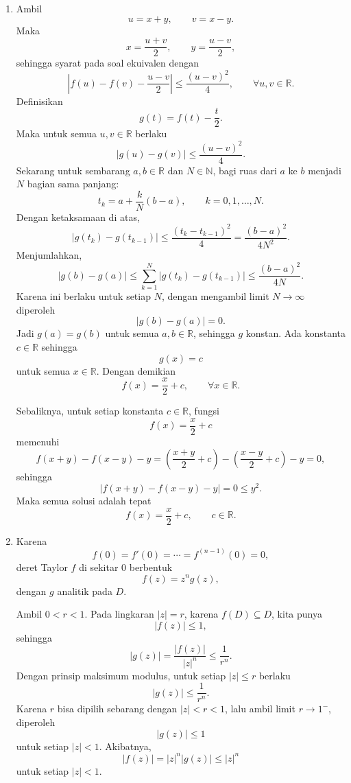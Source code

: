\documentclass[12pt]{article}
\begin{document}
\begin{enumerate}
  \item Ambil
        \[
          u=x+y,\qquad v=x-y.
        \]
        Maka
        \[
          x=\frac{u+v}{2},\qquad y=\frac{u-v}{2},
        \]
        sehingga syarat pada soal ekuivalen dengan
        \[
          \left|f(u)-f(v)-\frac{u-v}{2}\right|\le \frac{(u-v)^2}{4},
          \qquad \forall u,v\in\mathbb{R}.
        \]
        Definisikan
        \[
          g(t)=f(t)-\frac{t}{2}.
        \]
        Maka untuk semua $u,v\in\mathbb{R}$ berlaku
        \[
          |g(u)-g(v)|\le \frac{(u-v)^2}{4}.
        \]
        Sekarang untuk sembarang $a,b\in\mathbb{R}$ dan $N\in\mathbb{N}$, bagi ruas dari $a$ ke $b$ menjadi $N$ bagian sama panjang:
        \[
          t_k=a+\frac{k}{N}(b-a),\qquad k=0,1,\dots,N.
        \]
        Dengan ketaksamaan di atas,
        \[
          |g(t_k)-g(t_{k-1})|
          \le \frac{(t_k-t_{k-1})^2}{4}
          =\frac{(b-a)^2}{4N^2}.
        \]
        Menjumlahkan,
        \[
          |g(b)-g(a)|
          \le \sum_{k=1}^N |g(t_k)-g(t_{k-1})|
          \le \frac{(b-a)^2}{4N}.
        \]
        Karena ini berlaku untuk setiap $N$, dengan mengambil limit $N\to\infty$ diperoleh
        \[
          |g(b)-g(a)|=0.
        \]
        Jadi $g(a)=g(b)$ untuk semua $a,b\in\mathbb{R}$, sehingga $g$ konstan. Ada konstanta $c\in\mathbb{R}$ sehingga
        \[
          g(x)=c
        \]
        untuk semua $x\in\mathbb{R}$. Dengan demikian
        \[
          f(x)=\frac{x}{2}+c,
          \qquad \forall x\in\mathbb{R}.
        \]

        Sebaliknya, untuk setiap konstanta $c\in\mathbb{R}$, fungsi
        \[
          f(x)=\frac{x}{2}+c
        \]
        memenuhi
        \[
          f(x+y)-f(x-y)-y
          =\left(\frac{x+y}{2}+c\right)-\left(\frac{x-y}{2}+c\right)-y
          =0,
        \]
        sehingga
        \[
          |f(x+y)-f(x-y)-y|=0\le y^2.
        \]
        Maka semua solusi adalah tepat
        \[
          f(x)=\frac{x}{2}+c,\qquad c\in\mathbb{R}.
        \]

  \item Karena
        \[
          f(0)=f'(0)=\cdots=f^{(n-1)}(0)=0,
        \]
        deret Taylor $f$ di sekitar $0$ berbentuk
        \[
          f(z)=z^n g(z),
        \]
        dengan $g$ analitik pada $D$.

        Ambil $0<r<1$. Pada lingkaran $|z|=r$, karena $f(D)\subseteq D$, kita punya
        \[
          |f(z)|\le 1,
        \]
        sehingga
        \[
          |g(z)|=\frac{|f(z)|}{|z|^n}\le \frac{1}{r^n}.
        \]
        Dengan prinsip maksimum modulus, untuk setiap $|z|\le r$ berlaku
        \[
          |g(z)|\le \frac{1}{r^n}.
        \]
        Karena $r$ bisa dipilih sebarang dengan $|z|<r<1$, lalu ambil limit $r\to 1^-$, diperoleh
        \[
          |g(z)|\le 1
        \]
        untuk setiap $|z|<1$. Akibatnya,
        \[
          |f(z)|=|z|^n |g(z)|\le |z|^n
        \]
        untuk setiap $|z|<1$.


\end{enumerate}
\end{document}
